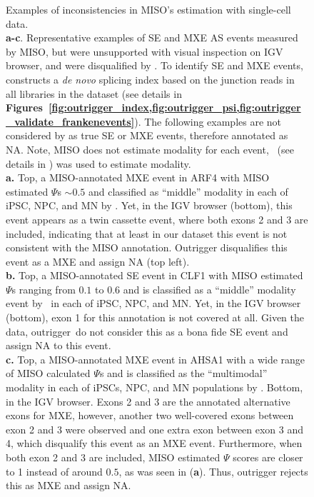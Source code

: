 \clearpage
\thispagestyle{facingcaption}
\begin{figure}[h]
\captionsetup{labelformat=prev-page}
  \caption[Examples of inconsistencies in MISO's estimation with single-cell data.]{Examples of inconsistencies in MISO's estimation with single-cell data.\\
\textbf{a-c}. Representative examples of SE and MXE AS events measured by MISO, but were unsupported with visual inspection on IGV browser, and were disqualified by \outrigger. To identify SE and MXE events, \outrigger\, constructs a \emph{de novo} splicing index based on the junction reads in all libraries in the dataset (see details in \textbf{Figures~\cref{fig:outrigger_index,fig:outrigger_psi,fig:outrigger_validate_frankenevents}}). The following examples are not considered by \outrigger as true SE or MXE events, therefore annotated as NA. Note, MISO does not estimate modality for each event, \anchor\, (see details in \textbf{}) was used to estimate modality.\\
\textbf{a.} Top, a MISO-annotated MXE event in ARF4 with MISO estimated $\Psi$s $\sim0.5$ and classified as ``middle'' modality in each of iPSC, NPC, and MN by \anchor. Yet, in the IGV browser (bottom), this event appears as a twin cassette event, where both exons 2 and 3 are included, indicating that at least in our dataset this event is not consistent with the MISO annotation. Outrigger disqualifies this event as a MXE and assign NA (top left).\\
\textbf{b.} Top, a MISO-annotated SE event in CLF1 with MISO estimated $\Psi$s ranging from $0.1$ to $0.6$ and is classified as a ``middle'' modality event by \anchor\, in each of iPSC, NPC, and MN.  Yet, in the IGV browser (bottom), exon 1 for this annotation is not covered at all. Given the data, outrigger\ do not consider this as a bona fide SE event and assign NA to this event.\\
\textbf{c.} Top, a MISO-annotated MXE event in AHSA1 with a wide range of MISO calculated $\Psi$s and is classified as the ``multimodal'' modality in each of iPSCs, NPC, and MN populations by \anchor. Bottom, in the IGV browser. Exons 2 and 3 are the annotated alternative exons for MXE, however, another two well-covered exons between exon 2 and 3 were observed and one extra exon between exon 3 and 4, which disqualify this event as an MXE event. Furthermore, when both exon 2 and 3 are included, MISO estimated $\Psi$ scores are closer to 1 instead of around $0.5$, as was seen in (\textbf{a}). Thus, outrigger rejects this as MXE and assign NA.\\
}
\end{figure}
